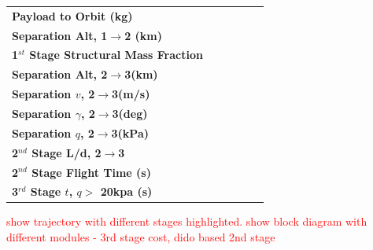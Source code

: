 \begin{table}[htb]
\begin{tabular}{l c c c c c}
		\hline \textbf{Payload to Orbit (kg)}  & \PayloadToOrbitConstq & \PayloadToOrbitFiftykPa & \PayloadToOrbitFortyFivekPa & \PayloadToOrbitFiftyFivekPa & \PayloadToOrbitHighDrag \\ 
		\textbf{Separation Alt, 1$\rightarrow$2 (km)}  & \FirstStageAltConstq & \FirstStageAltFifty & \FirstStageAltFortyFive &  \FirstStageAltFiftyFive &\FirstStageAltHighDrag \\ 
		\textbf{1$^{st}$ Stage Structural Mass Fraction} & \FirstStagesmfConstq & \FirstStagesmfFifty &  \FirstStagesmfFortyFive& \FirstStagesmfFiftyFive  & \FirstStagesmfHighDrag\\ 
		\textbf{Separation Alt, 2$\rightarrow$3(km)}  & \SeparationAltConstq & \SeparationAltFiftykPa & \SeparationAltFortyFivekPa & \SeparationAltFiftyFivekPa & \SeparationAltHighDrag\\ 
		\textbf{Separation $v$, 2$\rightarrow$3(m/s)} & \SeparationvConstq  & \SeparationvFiftykPa & \SeparationvFortyFivekPa &  \SeparationvFiftyFivekPa & \SeparationvHighDrag\\ 
		\textbf{Separation $\gamma$, 2$\rightarrow$3(deg)} & \SeparationAngleConstq& \SeparationAngleFiftykPa &\SeparationAngleFortyFivekPa& \SeparationAngleFiftyFivekPa&\SeparationAngleHighDrag \\ 
		\textbf{Separation $q$, 2$\rightarrow$3(kPa)} & \SeparationqConstq  &\SeparationqFiftykPa&\SeparationqFortyFivekPa &\SeparationqFiftyFivekPa& \SeparationqHighDrag \\ 
		\textbf{2$^{nd}$ Stage L/d, 2$\rightarrow$3} & \SeparationLDConstq&\SeparationLDFiftykPa & \SeparationLDFortyFivekPa & \SeparationLDFiftyFivekPa &\SeparationLDHighDrag\\
		\textbf{2$^{nd}$ Stage Flight Time (s)} & \FlightTimeConstq & \FlightTimeFiftykPa & \FlightTimeFortyFivekPa & \FlightTimeFiftyFivekPa & \FlightTimeHighDrag\\ 
		\textbf{3$^{rd}$ Stage $t$, $q >$ 20kpa (s)} &\toverConstq &\toverFiftykPa &\toverFortyFivekPa &\toverFiftyFivekPa & \toverHighDrag\\ 
		
		
		\hline 
	\end{tabular} 
	
	
	\label{table:Summary}
\end{table}

\textcolor{red}{show trajectory with different stages highlighted. show block diagram with different modules - 3rd stage cost, dido based 2nd stage}

